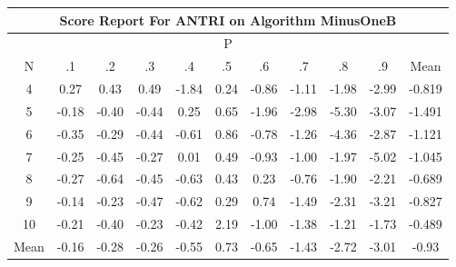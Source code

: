 \documentclass[11pt,a4paper]{report}
\begin{document}
\begin{longtable}{ | c || c | c | c | c | c | c | c | c | c || c |}
\hline
\multicolumn{11}{|c|}{ Score Report For ANTRI on Algorithm MinusOneB} \\
\hline
\multicolumn{11}{|c|}{ P } \\
\hline
N & .1 & .2 & .3 & .4 & .5 & .6 & .7 & .8 & .9 & Mean\\
 \hline
 \hline
 \endhead
  4 &  \cellcolor[HTML]{F7F7FF} 0.27 &  \cellcolor[HTML]{F7F7FF} 0.43 &  \cellcolor[HTML]{EFEFFF} 0.49 &  \cellcolor[HTML]{FFCFCF} -1.84 &  \cellcolor[HTML]{F7F7FF} 0.24 &  \cellcolor[HTML]{FFE7E7} -0.86 &  \cellcolor[HTML]{FFDFDF} -1.11 &  \cellcolor[HTML]{FFCFCF} -1.98 &  \cellcolor[HTML]{FFB7B7} -2.99 & -0.819 \\
  5 &  \cellcolor[HTML]{FFF7F7} -0.18 &  \cellcolor[HTML]{FFF7F7} -0.40 &  \cellcolor[HTML]{FFF7F7} -0.44 &  \cellcolor[HTML]{F7F7FF} 0.25 &  \cellcolor[HTML]{EFEFFF} 0.65 &  \cellcolor[HTML]{FFCFCF} -1.96 &  \cellcolor[HTML]{FFB7B7} -2.98 &  \cellcolor[HTML]{FF7878} -5.30 &  \cellcolor[HTML]{FFAFAF} -3.07 & -1.491 \\
  6 &  \cellcolor[HTML]{FFF7F7} -0.35 &  \cellcolor[HTML]{FFF7F7} -0.29 &  \cellcolor[HTML]{FFF7F7} -0.44 &  \cellcolor[HTML]{FFEFEF} -0.61 &  \cellcolor[HTML]{E7E7FF} 0.86 &  \cellcolor[HTML]{FFEFEF} -0.78 &  \cellcolor[HTML]{FFDFDF} -1.26 &  \cellcolor[HTML]{FF8F8F} -4.36 &  \cellcolor[HTML]{FFB7B7} -2.87 & -1.121 \\
  7 &  \cellcolor[HTML]{FFF7F7} -0.25 &  \cellcolor[HTML]{FFF7F7} -0.45 &  \cellcolor[HTML]{FFF7F7} -0.27 &  \cellcolor[HTML]{FFFFFF} 0.01 &  \cellcolor[HTML]{EFEFFF} 0.49 &  \cellcolor[HTML]{FFE7E7} -0.93 &  \cellcolor[HTML]{FFE7E7} -1.00 &  \cellcolor[HTML]{FFCFCF} -1.97 &  \cellcolor[HTML]{FF8080} -5.02 & -1.045 \\
  8 &  \cellcolor[HTML]{FFF7F7} -0.27 &  \cellcolor[HTML]{FFEFEF} -0.64 &  \cellcolor[HTML]{FFF7F7} -0.45 &  \cellcolor[HTML]{FFEFEF} -0.63 &  \cellcolor[HTML]{F7F7FF} 0.43 &  \cellcolor[HTML]{F7F7FF} 0.23 &  \cellcolor[HTML]{FFEFEF} -0.76 &  \cellcolor[HTML]{FFCFCF} -1.90 &  \cellcolor[HTML]{FFC7C7} -2.21 & -0.689 \\
  9 &  \cellcolor[HTML]{FFFFFF} -0.14 &  \cellcolor[HTML]{FFF7F7} -0.23 &  \cellcolor[HTML]{FFF7F7} -0.47 &  \cellcolor[HTML]{FFEFEF} -0.62 &  \cellcolor[HTML]{F7F7FF} 0.29 &  \cellcolor[HTML]{EFEFFF} 0.74 &  \cellcolor[HTML]{FFD7D7} -1.49 &  \cellcolor[HTML]{FFC7C7} -2.31 &  \cellcolor[HTML]{FFAFAF} -3.21 & -0.827 \\
  10 &  \cellcolor[HTML]{FFF7F7} -0.21 &  \cellcolor[HTML]{FFF7F7} -0.40 &  \cellcolor[HTML]{FFF7F7} -0.23 &  \cellcolor[HTML]{FFF7F7} -0.42 &  \cellcolor[HTML]{C7C7FF} 2.19 &  \cellcolor[HTML]{FFE7E7} -1.00 &  \cellcolor[HTML]{FFDFDF} -1.38 &  \cellcolor[HTML]{FFDFDF} -1.21 &  \cellcolor[HTML]{FFD7D7} -1.73 & -0.489 \\
 \hline
 \hline
Mean &  \cellcolor[HTML]{FFF7F7} -0.16 &  \cellcolor[HTML]{FFF7F7} -0.28 &  \cellcolor[HTML]{FFF7F7} -0.26 &  \cellcolor[HTML]{FFEFEF} -0.55 &  \cellcolor[HTML]{EFEFFF} 0.73 &  \cellcolor[HTML]{FFEFEF} -0.65 &  \cellcolor[HTML]{FFDFDF} -1.43 &  \cellcolor[HTML]{FFB7B7} -2.72 &  \cellcolor[HTML]{FFB7B7} -3.01 &  \cellcolor[HTML]{FFE7E7} -0.93
\end{longtable}
\end{document}
